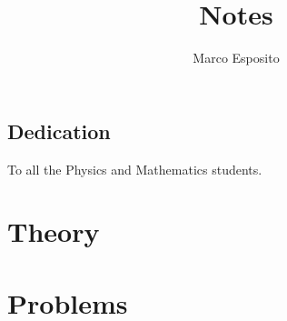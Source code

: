 \documentclass[12pt,twoside]{book}
\title{
{Notes}
}
\author{Marco Esposito}
\date{}
\theoremstyle{definition}
\theoremstyle{plain}
\theoremstyle{definition}
\begin{document}
\frontmatter
\maketitle

\chapter*{Dedication}
To all the Physics and Mathematics students. 

%

%

\tableofcontents

\mainmatter



\part{Theory} 
%


%


\part{Problems}
%

%



\backmatter

\clearpage
 

\end{document}
